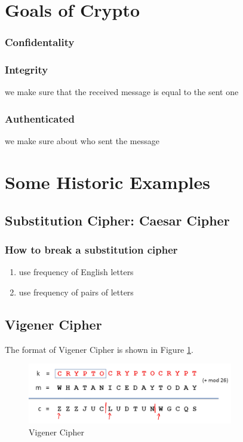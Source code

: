 


\section{Goals of Crypto}

\subsubsection{Confidentality}

\subsubsection{Integrity}
we make sure that the received message is equal to the sent one


\subsubsection{Authenticated}
we make sure about who sent the message

\section{Some Historic Examples}

\subsection{Substitution Cipher: Caesar Cipher}


\subsubsection{How to break a substitution cipher}

\begin{enumerate}
    \item use frequency of English letters
    \item use frequency of pairs of letters
\end{enumerate}


\subsection{Vigener Cipher}

The format of Vigener Cipher is shown in Figure \ref{fig: 01 Vigener Cipher}.

\begin{figure}
    \centering
    \includegraphics[width=0.8\textwidth]{Stanford_Crypto_1/fig/01_Introduction/Vigener Cipher.png}
    \caption{Vigener Cipher}
    \label{fig: 01 Vigener Cipher}
\end{figure}


